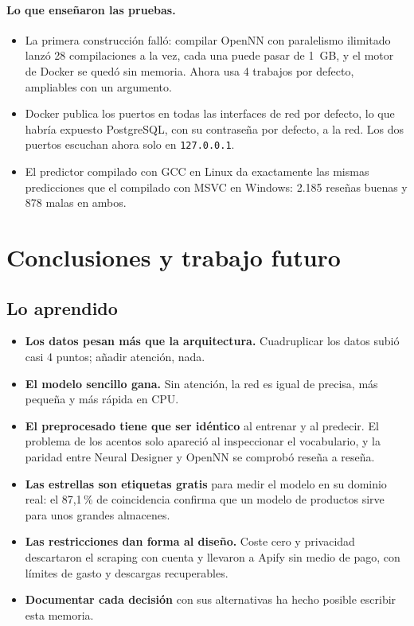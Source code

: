 \documentclass[11pt,a4paper]{article}
\newcommand{\pct}[1]{#1\,\%}
\newcommand{\code}[1]{\texttt{\small #1}}
\begin{document}
\paragraph{Lo que enseñaron las pruebas.}
\begin{itemize}
  \item La primera construcción falló: compilar OpenNN con paralelismo ilimitado lanzó 28 compilaciones a la vez,
        cada una puede pasar de 1~GB, y el motor de Docker se quedó sin memoria. Ahora usa 4 trabajos por defecto,
        ampliables con un argumento.
  \item Docker publica los puertos en todas las interfaces de red por defecto, lo que habría expuesto PostgreSQL,
        con su contraseña por defecto, a la red. Los dos puertos escuchan ahora solo en \code{127.0.0.1}.
  \item El predictor compilado con GCC en Linux da exactamente las mismas predicciones que el compilado con MSVC en
        Windows: 2.185 reseñas buenas y 878 malas en ambos.
\end{itemize}

\section{Conclusiones y trabajo futuro}

\subsection{Lo aprendido}

\begin{itemize}
  \item \textbf{Los datos pesan más que la arquitectura.} Cuadruplicar los datos subió casi 4 puntos; añadir atención,
        nada.
  \item \textbf{El modelo sencillo gana.} Sin atención, la red es igual de precisa, más pequeña y más rápida en CPU.
  \item \textbf{El preprocesado tiene que ser idéntico} al entrenar y al predecir. El problema de los acentos solo
        apareció al inspeccionar el vocabulario, y la paridad entre Neural Designer y OpenNN se comprobó reseña a
        reseña.
  \item \textbf{Las estrellas son etiquetas gratis} para medir el modelo en su dominio real: el \pct{87,1} de
        coincidencia confirma que un modelo de productos sirve para unos grandes almacenes.
  \item \textbf{Las restricciones dan forma al diseño.} Coste cero y privacidad descartaron el scraping con cuenta y
        llevaron a Apify sin medio de pago, con límites de gasto y descargas recuperables.
  \item \textbf{Documentar cada decisión} con sus alternativas ha hecho posible escribir esta memoria.
\end{itemize}
\end{document}
